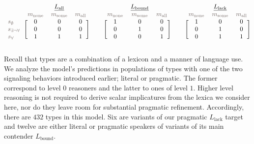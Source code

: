 \documentclass[a4paper]{article}
\newcommand{\state}{\ensuremath{s}\xspace}		%
\newcommand{\mystate}[1]{\ensuremath{\state_{\text{#1}}}\xspace} %
\newcommand{\mylang}[1]{\ensuremath{L_{\text{#1}}}\xspace} %
\newcommand{\messg}{\ensuremath{m}\xspace}		%
\newcommand{\mymessg}[1]{\ensuremath{\messg_{\text{#1}}}\xspace} %
\newcommand{\ssome}{\mystate{\ensuremath{\exists\neg\forall}}}
\newcommand{\sall}{\mystate{\ensuremath{\forall}}}
\newcommand{\snone}{\mystate{\ensuremath{\emptyset}}}
\newcommand{\msome}{\mymessg{some}}
\newcommand{\mall}{\mymessg{all}}
\newcommand{\mnone}{\mymessg{none}}
\newcommand{\Lall}{\mylang{all}}
\newcommand{\Lbound}{\mylang{bound}}
\newcommand{\Llack}{\mylang{lack}}
\newcommand{\mygray}[1]{{\textcolor{mygray}{#1}}}
\begin{document}
\begin{align*}
  \begin{blockarray}{lccc}
    & & \underline{\Lall} & \\
    & \mygray{\mnone} & \mygray{\msome} & \mygray{\mall} \\
    \begin{block}{l[ccc]}
     \mygray{\snone}  & 0 & 0 & 0\\
     \mygray{\ssome}  & 0 & 0 & 0\\
    \mygray{\sall}   & 1 & 1 & 1\\
    \end{block}
  \end{blockarray} & &
 \begin{blockarray}{lccc}
    & & \underline{\Lbound} & \\
    & \mygray{\mnone} & \mygray{\msome} & \mygray{\mall} \\
    \begin{block}{l[ccc]}
       & 1 & 0 & 0\\
       & 0 & 1 & 0\\
       & 0 & 0 & 1\\
    \end{block}
  \end{blockarray} & &
  \begin{blockarray}{lccc}
    & & \underline{\Llack} & \\
    & \mygray{\mnone} & \mygray{\msome} & \mygray{\mall} \\
    \begin{block}{l[ccc]}
       & 1 & 0 & 0\\
       & 0 & 1 & 0\\
       & 0 & 1 & 1\\
    \end{block}
  \end{blockarray}
\end{align*}



Recall that types are a combination of a lexicon and a manner of language use. We analyze the model's predictions in populations of types with one of the two signaling behaviors introduced earlier; literal or pragmatic. The former correspond to level $0$ reasoners and the latter to ones of level $1$. Higher level reasoning is not required to derive scalar implicatures from the lexica we consider here, nor do they leave room for substantial pragmatic refinement. Accordingly, there are $432$ types in this model. Six are variants of our pragmatic $\Llack$ target and twelve are either literal or pragmatic speakers of variants of its main contender $\Lbound$.
\end{document}
